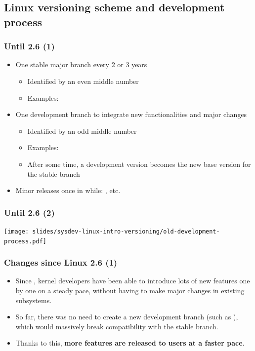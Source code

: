 \subsection{Linux versioning scheme and development process}

\begin{frame}
  \frametitle{Until 2.6 (1)}
  \begin{itemize}
  \item One stable major branch every 2 or 3 years
    \begin{itemize}
    \item Identified by an even middle number
    \item Examples: 
    \end{itemize}
  \item One development branch to integrate new functionalities and
    major changes
    \begin{itemize}
    \item Identified by an odd middle number
    \item Examples: 
    \item After some time, a development version becomes the new base
      version for the stable branch
    \end{itemize}
  \item Minor releases once in while: , etc.
  \end{itemize}
\end{frame}

\begin{frame}
  \frametitle{Until 2.6 (2)}
  \begin{center}
    \texttt{[image: slides/sysdev-linux-intro-versioning/old-development-process.pdf]}
  \end{center}
\end{frame}

\begin{frame}
  \frametitle{Changes since Linux 2.6 (1)}
  \begin{itemize}
  \item Since , kernel developers have been able to
    introduce lots of new features one by one on a steady pace,
    without having to make major changes in existing subsystems.
  \item So far, there was no need to create a new development branch
    (such as ), which would massively break compatibility
    with the stable branch.
  \item Thanks to this, {\bf more features are released to users at a
      faster pace}.
  \end{itemize}
\end{frame}

